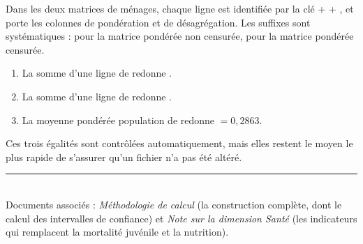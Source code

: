 \documentclass[11pt,a4paper]{article}
\begin{document}
Dans les deux matrices de ménages, chaque ligne est identifiée par la clé  +
 + , et porte les colonnes de pondération et de désagrégation. Les suffixes
sont systématiques :  pour la matrice pondérée non censurée,
 pour la matrice pondérée censurée.

\begin{retenir}
\begin{enumerate}
  \item La somme d'une ligne de  redonne .
  \item La somme d'une ligne de  redonne .
  \item La moyenne pondérée population de  redonne \ipm{} $= 0{,}2863$.
\end{enumerate}
Ces trois égalités sont contrôlées automatiquement, mais elles restent le moyen le plus rapide de
s'assurer qu'un fichier n'a pas été altéré.
\end{retenir}

\vfill
\noindent\rule{\linewidth}{0.4pt}\\[2pt]
\small
Documents associés : \emph{Méthodologie de calcul} (la construction complète, dont le calcul des
intervalles de confiance) et \emph{Note sur la dimension Santé} (les indicateurs qui remplacent la
mortalité juvénile et la nutrition).
\end{document}
